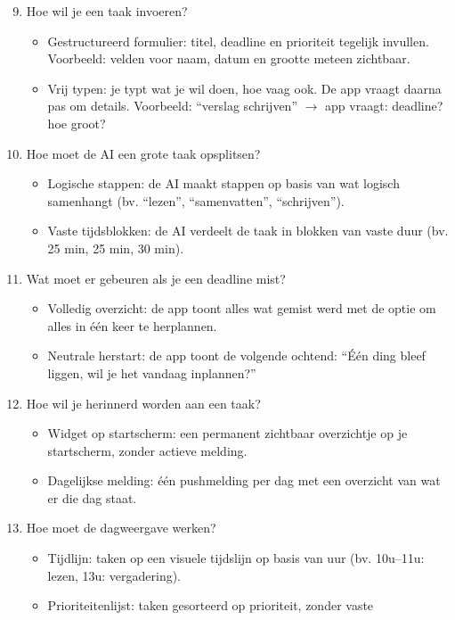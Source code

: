 \begin{enumerate}
  \setcounter{enumi}{8}
  \item Hoe wil je een taak invoeren?
  \begin{itemize}
    \item Gestructureerd formulier: titel, deadline en prioriteit tegelijk
    invullen. Voorbeeld: velden voor naam, datum en grootte meteen zichtbaar.
    \item Vrij typen: je typt wat je wil doen, hoe vaag ook. De app vraagt
    daarna pas om details. Voorbeeld: ``verslag schrijven'' $\rightarrow$ app
    vraagt: deadline? hoe groot?
  \end{itemize}
  \item Hoe moet de AI een grote taak opsplitsen?
  \begin{itemize}
    \item Logische stappen: de AI maakt stappen op basis van wat logisch
    samenhangt (bv. ``lezen'', ``samenvatten'', ``schrijven'').
    \item Vaste tijdsblokken: de AI verdeelt de taak in blokken van vaste
    duur (bv. 25 min, 25 min, 30 min).
  \end{itemize}
  \item Wat moet er gebeuren als je een deadline mist?
  \begin{itemize}
    \item Volledig overzicht: de app toont alles wat gemist werd met de
    optie om alles in één keer te herplannen.
    \item Neutrale herstart: de app toont de volgende ochtend: ``Één ding
    bleef liggen, wil je het vandaag inplannen?''
  \end{itemize}
  \item Hoe wil je herinnerd worden aan een taak?
  \begin{itemize}
    \item Widget op startscherm: een permanent zichtbaar overzichtje op je
    startscherm, zonder actieve melding.
    \item Dagelijkse melding: één pushmelding per dag met een overzicht van
    wat er die dag staat.
  \end{itemize}
  \item Hoe moet de dagweergave werken?
  \begin{itemize}
    \item Tijdlijn: taken op een visuele tijdslijn op basis van uur (bv.
    10u--11u: lezen, 13u: vergadering).
    \item Prioriteitenlijst: taken gesorteerd op prioriteit, zonder vaste

\end{itemize}
\end{enumerate}
